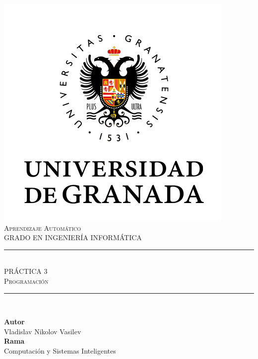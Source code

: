 \documentclass[11pt,a4paper]{article}
\newcommand{\asignatura}{Aprendizaje Automático}
\newcommand{\autor}{Vladislav Nikolov Vasilev}
\begin{document}

\begin{titlepage}

\begin{minipage}{\textwidth}

\centering

\includegraphics[scale=0.5]{img/ugr.png}\\

\textsc{\Large \asignatura{}\\[0.2cm]}
\textsc{GRADO EN INGENIERÍA INFORMÁTICA}\\[1cm]

\noindent\rule[-1ex]{\textwidth}{1pt}\\[1.5ex]
\textsc{{\Huge PRÁCTICA 3\\[0.5ex]}}
\textsc{{\Large Programación\\}}
\noindent\rule[-1ex]{\textwidth}{2pt}\\[3.5ex]

\end{minipage}

\vspace{0.5cm}

\begin{minipage}{\textwidth}

\centering

\textbf{Autor}\\ {\autor{}}\\[2.5ex]
\textbf{Rama}\\ {Computación y Sistemas Inteligentes}\\[2.5ex]
\vspace{0.3cm}


\end{minipage}
\end{titlepage}
\end{document}
